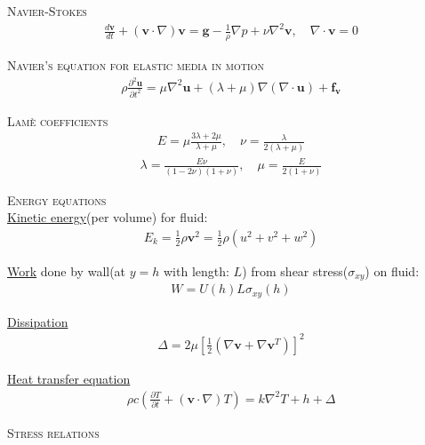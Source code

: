 \documentclass[11pt,a4paper,english]{article}
\begin{document}
{\scshape Navier-Stokes} 
\begin{align*}
\frac{d \mathbf{v}}{dt} + (\mathbf{v} \cdot \nabla)\mathbf{v} = \mathbf{g} - \frac{1}{\rho} \nabla p + \nu \nabla^2 \mathbf{v}, \quad \nabla \cdot \mathbf{v} = 0  
\end{align*}

{\scshape Navier's equation for elastic media in motion} \\
\begin{align*}
\rho \frac{\partial^2 \mathbf{u}}{\partial t^2} = \mu \nabla^2 \mathbf{u} + (\lambda + \mu) \nabla ( \nabla \cdot \mathbf{u}) + \mathbf{f_v}
\end{align*}

{\scshape Lamè coefficients} 
\begin{align*}
E=\mu \frac{3\lambda + 2\mu}{\lambda + \mu}, \quad \nu = \frac{\lambda}{2(\lambda + \mu)}
\end{align*}
\begin{align*}
\lambda = \frac{E \nu}{(1-2\nu)(1+\nu)}, \quad \mu = \frac{E}{2(1+\nu)}
\end{align*}

\vspace{1cm}

{\scshape Energy equations} \\

\underline{Kinetic energy}(per volume) for fluid:
\begin{align*}
E_k = \frac{1}{2} \rho \mathbf{v}^2 = \frac{1}{2} \rho (u^2 + v^2 + w^2) 
\end{align*}

\underline{Work} done by wall(at $y=h$ with length: $L$) from shear stress($\sigma_{xy}$) on fluid:
\begin{align*}
W = U(h) L \sigma_{xy}(h)
\end{align*}

\underline{Dissipation}
\begin{align*}
\Delta = 2 \mu [\frac{1}{2} (\nabla \mathbf{v}  + \nabla \mathbf{v}^T  ) ]^2
\end{align*}

\underline{Heat transfer equation}
\begin{align*}
\rho c \left(\frac{\partial T}{\partial t} + (\mathbf{v} \cdot \nabla)T \right) = k \nabla^2 T + h + \Delta 
\end{align*}

\vspace{1cm}

{\scshape Stress relations} \\
\end{document}
